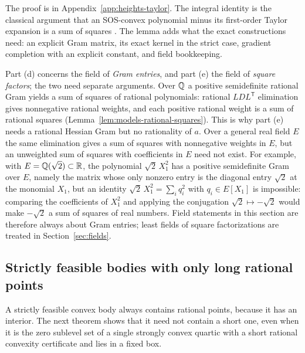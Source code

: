 The proof is in Appendix~\ref{app:heights-taylor}. The integral identity is
the classical argument that an SOS-convex polynomial minus its first-order
Taylor expansion is a sum of squares \cite{HeltonNie2010,Lasserre2009}. The
lemma adds what the exact constructions need: an explicit Gram matrix, its
exact kernel in the strict case, gradient completion with an explicit
constant, and field bookkeeping.

\begin{remark}
\label{rem:heights-gram-field}
Part (d) concerns the field of \emph{Gram entries}, and part (e) the field of
\emph{square factors}; the two need separate arguments. Over $\mathbb Q$ a positive
semidefinite rational Gram yields a sum of squares of rational polynomials:
rational $LDL^{\mathsf T}$ elimination gives nonnegative rational weights, and
each positive rational weight is a sum of rational squares
(Lemma~\ref{lem:models-rational-squares}). This is why part (e) needs a
rational Hessian Gram but no rationality of $a$. Over a general real field
$E$ the same elimination gives a sum of squares with nonnegative weights in
$E$, but an unweighted sum of squares with coefficients in $E$ need not
exist. For
example, with $E=\mathbb Q(\sqrt2)\subset\mathbb R$, the polynomial $\sqrt2\,X_1^2$ has a
positive semidefinite Gram over $E$, namely the matrix whose only nonzero
entry is the diagonal entry $\sqrt2$ at the monomial $X_1$, but an identity
$\sqrt2\,X_1^2=\sum_iq_i^2$ with $q_i\in E[X_1]$ is impossible: comparing the
coefficients of $X_1^2$ and applying the conjugation $\sqrt2\mapsto-\sqrt2$
would make $-\sqrt2$ a sum of squares of real numbers. Field statements in this
section are therefore always about Gram entries; least fields of square
factorizations are treated in Section~\ref{sec:fields}.
\end{remark}

\subsection{Strictly feasible bodies with only long rational points}
\label{sec:heights-witness}

A strictly feasible convex body always contains rational points, because it
has an interior. The next theorem shows that it need not contain a short
one, even when it is the zero sublevel set of a single strongly convex
quartic with a short rational convexity certificate and lies in a fixed box.

